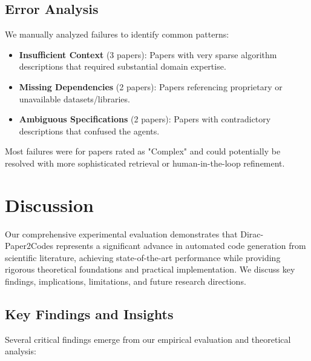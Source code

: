 \documentclass{ieeeaccess}
\begin{document}
\subsection{Error Analysis}
We manually analyzed failures to identify common patterns:
\begin{itemize}
    \item \textbf{Insufficient Context} (3 papers): Papers with very sparse algorithm descriptions that required substantial domain expertise.
    \item \textbf{Missing Dependencies} (2 papers): Papers referencing proprietary or unavailable datasets/libraries.
    \item \textbf{Ambiguous Specifications} (2 papers): Papers with contradictory descriptions that confused the agents.
\end{itemize}

Most failures were for papers rated as "Complex" and could potentially be resolved with more sophisticated retrieval or human-in-the-loop refinement.

\section{Discussion}\label{sec:discussion}
Our comprehensive experimental evaluation demonstrates that Dirac-Paper2Codes represents a significant advance in automated code generation from scientific literature, achieving state-of-the-art performance while providing rigorous theoretical foundations and practical implementation. We discuss key findings, implications, limitations, and future research directions.

\subsection{Key Findings and Insights}
Several critical findings emerge from our empirical evaluation and theoretical analysis:
\end{document}
